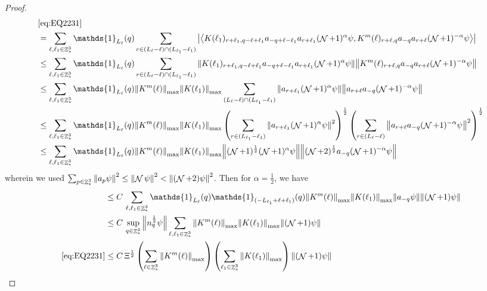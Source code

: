 \documentclass[sn-mathphys, Numbered ,a4paper]{sn-jnl}%
\DeclareMathOperator{\Z}{\mathbb{Z}}
\DeclareMathOperator{\NN}{\mathcal{N}}
\newcommand{\half}{\frac{1}{2}}
\newcommand{\eva}[1]{\left\langle #1 \right\rangle}
\theoremstyle{plain}
\theoremstyle{definition}
\theoremstyle{remark}
\theoremstyle{plain}
\theoremstyle{definition}
\theoremstyle{remark}
\begin{document}
\begin{proof}
\begin{align}
		&\eqref{eq:EQ2231}\nonumber\\
		&= \sum\limits_{\ell, \ell_1\in \Z^3_*} \mathds{1}_{L_{\ell}}(q)  \sum\limits_{r\in (L_{\ell}-\ell) \cap (L_{\ell_1}-\ell_1)} \abs{\eva{ K(\ell_1)_{r+\ell_1,q-\ell+\ell_1} a_{-q+\ell-\ell_1} a_{r+\ell_1}(\NN+1)^{\alpha}\psi, K^m(\ell)_{r+\ell,q} a_{-q}a_{r+\ell} (\NN+1)^{-\alpha} \psi }}\nonumber\\
		&\leq \sum\limits_{\ell, \ell_1\in \Z^3_*} \mathds{1}_{L_{\ell}}(q)  \sum\limits_{r\in(L_{\ell}-\ell) \cap (L_{\ell_1}-\ell_1)} \norm{ K(\ell_1)_{r+\ell_1,q-\ell+\ell_1} a_{-q+\ell-\ell_1} a_{r+\ell_1}(\NN+1)^{\alpha}\psi}\norm{ K^m(\ell)_{r+\ell,q} a_{-q}a_{r+\ell} (\NN+1)^{-\alpha} \psi }\nonumber\\
		&\leq \sum\limits_{\ell, \ell_1\in \Z^3_*} \mathds{1}_{L_{\ell}}(q)   \norm{K^m(\ell)}_{\mathrm{max}} \norm{ K(\ell_1)}_{\mathrm{max}}\sum\limits_{(L_{\ell}-\ell) \cap (L_{\ell_1}-\ell_1)} \norm{ a_{r+\ell_1}(\NN+1)^{\alpha}\psi}\norm{ a_{r+\ell} a_{-q} (\NN+1)^{-\alpha} \psi }\nonumber\\
		&\leq \sum\limits_{\ell, \ell_1\in \Z^3_*} \mathds{1}_{L_{\ell}}(q)   \norm{K^m(\ell)}_{\mathrm{max}} \norm{ K(\ell_1)}_{\mathrm{max}}\left(\sum\limits_{r\in  (L_{\ell_1}-\ell_1)} \norm{ a_{r+\ell_1} (\NN+1)^{\alpha} \psi}^2\right)^\half\left( \sum\limits_{r\in (L_{\ell}-\ell) } \norm{ a_{r+\ell} a_{-q} (\NN+1)^{-\alpha} \psi }^2\right)^\half\nonumber\\
		&\leq \sum\limits_{\ell, \ell_1\in \Z^3_*} \mathds{1}_{L_{\ell}}(q)  \norm{K^m(\ell)}_{\mathrm{max}} \norm{ K(\ell_1)}_{\mathrm{max}} \norm{ (\NN+1)^\half(\NN+1)^{\alpha} \psi} \norm{ (\NN+2)^\half a_{-q} (\NN+1)^{-\alpha} \psi }\nonumber
	\end{align} 
	wherein we used $\sum_{p\in \Z^3_*}\norm{a_p \psi}^2\leq\norm{\NN\psi}^2<\norm{(\NN+2)\psi}^2$. Then for $\alpha =  \half $, we have 
	\begin{align}
		&\leq C\,\sum\limits_{\ell, \ell_1\in \Z^3_*} \mathds{1}_{L_{\ell}}(q) \mathds{1}_{(-L_{\ell_1}+\ell+\ell_1)}(q)  \norm{K^m(\ell)}_{\mathrm{max}} \norm{ K(\ell_1)}_{\mathrm{max}}  \norm{a_{-q} \psi } \norm{ (\NN+1) \psi} \nonumber\\
		&\leq C\, \sup\limits_{q\in \Z^3_*}\norm{n_q^\half \psi } \sum\limits_{\ell, \ell_1\in \Z^3_*}   \norm{K^m(\ell)}_{\mathrm{max}} \norm{ K(\ell_1)}_{\mathrm{max}}   \norm{ (\NN+1) \psi} \nonumber\\
		\eqref{eq:EQ2231}&\leq C\, \Xi^\half \left(\sum\limits_{\ell\in \Z^3_*} \norm{K^m(\ell)}_{\mathrm{max}}\right)\left(  \sum\limits_{ \ell_1\in \Z^3_*}  \norm{ K(\ell_1)}_{\mathrm{max}} \right) \norm{ (\NN+1) \psi}\label{eq:estEQ2231} 

\end{align}
\end{proof}
\end{document}
